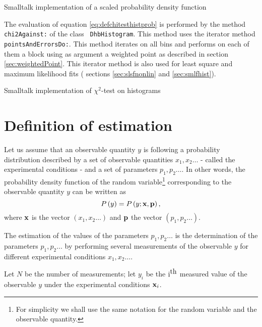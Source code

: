 \documentclass[twoside]{book}
\begin{document}
\begin{listing} Smalltalk implementation of a scaled
probability density function \label{ls:scaleddist}

\end{listing}

The evaluation of equation \ref{eq:defchitesthistprob} is
performed by the method {\tt chi2Against:} of the class {\tt
DhbHistogram}. This method uses the iterator method {\tt
pointsAndErrorsDo:}. This method iterates on all bins and performs
on each of them a block using as argument a weighted point as
described in section \ref{sec:weightedPoint}. This iterator method
is also used for least square and maximum likelihood fits (\cf
sections \ref{sec:slsfnonlin} and \ref{sec:smlfhist}).

\begin{listing} Smalltalk implementation of $\chi^2$-test on histograms \label{ls:chitesthist}

\end{listing}

\section{Definition of estimation}
Let us assume that an observable quantity $y$ is following a
probability distribution described by a set of observable
quantities $x_1,x_2\ldots$ - called the experimental conditions -
and a set of parameters $p_1,p_2\ldots$. In other words, the
probability density function of the random variable\footnote{For
simplicity we shall use the same notation for the random variable
and the observable quantity.} corresponding to the observable
quantity $y$ can be written as
\begin{equation}
\label{eq:estimprob}
  P\left(y\right)=P\left(y;{\bf x},{\bf p}\right),
\end{equation}
where ${\bf x}$ is the vector $\left(x_1,x_2\ldots\right)$ and
${\bf p}$ the vector $\left(p_1,p_2\ldots\right)$.

The estimation of the values of the parameters $p_1,p_2\ldots$ is
the determination of the parameters $p_1,p_2\ldots$ by performing
several measurements of the observable $y$ for different
experimental conditions $x_1,x_2\ldots$.

Let $N$ be the number of measurements; let $y_i$ be the $\mbox{\rm
i}^{\mbox{\rm th}}$ measured value of the observable $y$ under the
experimental conditions ${\bf x}_i$.
\end{document}
